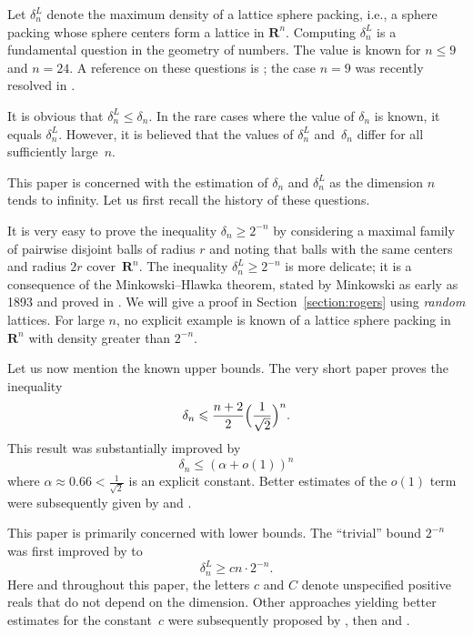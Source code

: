 \documentclass[12pt]{amsart}
\newcommand{\R}{\mathbf{R}}
\renewcommand{\leq}{\leqslant}
\renewcommand{\geq}{\geqslant}
\theoremstyle{plain}
\theoremstyle{remark}
\begin{document}
Let $\delta_n^L$ denote the maximum density of a lattice sphere packing, i.e., a sphere packing whose sphere centers form a lattice in $\R^n$. Computing $\delta_n^L$ is a fundamental question in the geometry of numbers. The value is known for $n \leq 9$ and $n=24$. A reference on these questions is \cite{Splag}; the case $n=9$ was recently resolved in \cite{SW25}.
 
It is obvious that $\delta_n^L \leq \delta_n$. In the rare cases where the value of $\delta_n$ is known, it equals $\delta_n^L$. However, it is believed that the values of $\delta_n^L$ and~$\delta_n$ differ for all sufficiently large~$n$.
 
This paper is concerned with the estimation of $\delta_n$ and $\delta_n^L$ as the dimension $n$ tends to infinity. Let us first recall the history of these questions.
 
It is very easy to prove the inequality $\delta_n \geq 2^{-n}$ by considering a maximal family of pairwise disjoint balls of radius $r$ and noting that balls with the same centers and radius $2r$ cover~$\R^n$. The inequality $\delta_n^L \geq 2^{-n}$ is more delicate; it is a consequence of the Minkowski--Hlawka theorem, stated by Minkowski as early as 1893 and proved in \cite{Hlawka43}. We will give a proof in Section~\ref{section:rogers} using \emph{random} lattices. For large $n$, no explicit example is known of a lattice sphere packing in $\R^n$ with density greater than $2^{-n}$.
 
Let us now mention the known upper bounds. The very short paper \cite{Blichfeldt29} proves the inequality
\[ \delta_n \leq \frac{n+2}{2} \Bigl( \frac{1}{\sqrt{2}} \Bigr)^n .\]
This result was substantially improved by \cite{KL78}
\begin{equation} \label{eq:KL}  \delta_n \leq ( \alpha+o(1)) ^n \end{equation}
where $\alpha \approx 0.66 < \frac{1}{\sqrt{2}}$ is an explicit constant. Better estimates of the $o(1)$ term were subsequently given by \cite{CZ14} and \cite{SZ24}.
 
This paper is primarily concerned with lower bounds.
The ``trivial'' bound $2^{-n}$ was first improved by \cite{Rogers47} to
\begin{equation}
\label{eq:rogers}
 \delta_n^L \geq c n  \cdot 2^{-n}. \end{equation}
Here and throughout this paper, the letters $c$ and $C$ denote unspecified positive reals that do not depend on the dimension.
Other approaches yielding better estimates for the constant~$c$ were subsequently proposed by \cite{DR47}, then \cite{Ball92} and \cite{Vance11}.
 
\end{document}
